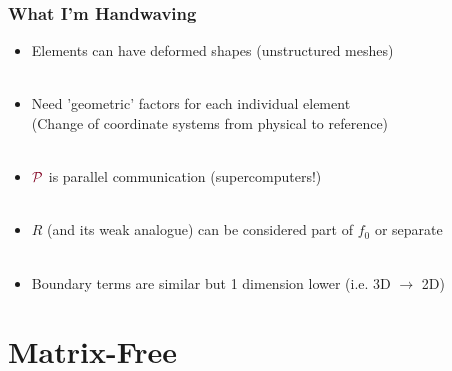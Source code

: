 \documentclass{beamer}
\begin{document}
\begin{frame}
\begin{center}
\frametitle{What I'm Handwaving}

\begin{itemize}

\item Elements can have deformed shapes (unstructured meshes)\\

~\\

\item Need 'geometric' factors for each individual element\\
(Change of coordinate systems from physical to reference)\\

~\\

\item ${\color{burgundy}\mathcal{P}}$ is parallel communication (supercomputers!)\\

~\\

\item $R$ (and its weak analogue) can be considered part of $f_0$ or separate\\

~\\

\item Boundary terms are similar but 1 dimension lower (i.e. 3D $\rightarrow$ 2D)

\end{itemize}

\end{center}
\end{frame}

\section{Matrix-Free}
\end{document}
